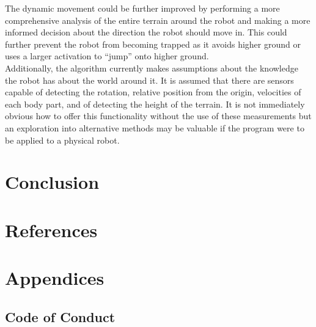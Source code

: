 \documentclass{article}
\begin{document}
The dynamic movement could be further improved by performing a more comprehensive analysis of the entire terrain around the robot and making a more informed decision about the direction the robot should move in. This could further prevent the robot from becoming trapped as it avoids higher ground or uses a larger activation to “jump” onto higher ground.\\ Additionally, the algorithm currently makes assumptions about the knowledge the robot has about the world around it. It is assumed that there are sensors capable of detecting the rotation, relative position from the origin, velocities of each body part, and of detecting the height of the terrain. It is not immediately obvious how to offer this functionality without the use of these measurements but an exploration into alternative methods may be valuable if the program were to be applied to a physical robot. \\



\newpage
\section{Conclusion}

\newpage

\section{References}

\newpage
\section{Appendices}
\subsection{Code of Conduct}
\end{document}

